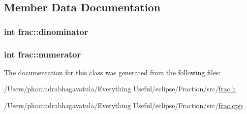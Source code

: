 \subsection{Member Data Documentation}
\hypertarget{classfrac_a1a245c07a3963fe0e88233d9587f5f69}{
\subsubsection[{dinominator}]{\setlength{\rightskip}{0pt plus 5cm}int frac\-::dinominator\hspace{0.3cm}{\ttfamily [private]}}}\label{classfrac_a1a245c07a3963fe0e88233d9587f5f69}
\hypertarget{classfrac_ac9ddb6a305789ceb081a3235dcb54b66}{
\subsubsection[{numerator}]{\setlength{\rightskip}{0pt plus 5cm}int frac\-::numerator\hspace{0.3cm}{\ttfamily [private]}}}\label{classfrac_ac9ddb6a305789ceb081a3235dcb54b66}


The documentation for this class was generated from the following files\-:\begin{DoxyCompactItemize}
\item 
/\-Users/phanindrabhagavatula/\-Everything Useful/eclipse/\-Fraction/src/\hyperlink{frac_8h}{frac.\-h}\item 
/\-Users/phanindrabhagavatula/\-Everything Useful/eclipse/\-Fraction/src/\hyperlink{frac_8cpp}{frac.\-cpp}\end{DoxyCompactItemize}
